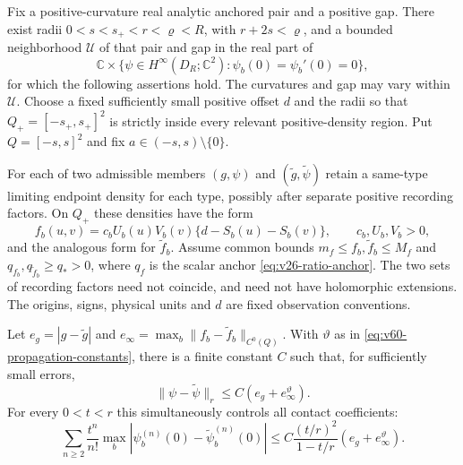 \begin{theorem}
\label{thm:v60-real-observation-stability}
Fix a positive-curvature real analytic anchored pair and a positive gap.
There exist radii $0<s<s_+<r<\varrho<R$, with
$r+2s<\varrho$, and a bounded neighborhood $\mathcal U$ of that pair
and gap in the real part of
\[
 \mathbb C\times\{\psi\in H^\infty(D_R;\mathbb C^2):
                              \psi_b(0)=\psi_b'(0)=0\},
\]
for which the following assertions hold.  The curvatures and gap may
vary within $\mathcal U$.  Choose a fixed sufficiently small positive
offset $d$ and the radii so that
$Q_+=[-s_+,s_+]^2$ is strictly inside every relevant positive-density
region.  Put $Q=[-s,s]^2$ and fix $a\in(-s,s)\setminus\{0\}$.

For each of two admissible members $(g,\psi)$ and
$(\widetilde g,\widetilde\psi)$ retain a same-type limiting endpoint
density for each type, possibly after separate positive recording
factors.  On $Q_+$ these densities have the form
\begin{equation}\label{eq:v60-recorded-density}
 f_b(u,v)=c_b U_b(u)V_b(v)
           \{d-S_b(u)-S_b(v)\},\qquad c_b,U_b,V_b>0,
\end{equation}
and the analogous form for $\widetilde f_b$.
Assume common bounds $m_f\le f_b,\widetilde f_b\le M_f$ and
$q_{f_b},q_{\widetilde f_b}\ge q_*>0$, where $q_f$ is the scalar
anchor \eqref{eq:v26-ratio-anchor}.  The two sets of recording factors
need not coincide, and need not have holomorphic extensions.
The origins, signs, physical units and $d$ are fixed observation
conventions.

Let $e_g=|g-\widetilde g|$ and
$e_\infty=\max_b\|f_b-\widetilde f_b\|_{C^0(Q)}$.
With $\vartheta$ as in \eqref{eq:v60-propagation-constants}, there is
a finite constant $C$ such that, for sufficiently small errors,
\begin{equation}\label{eq:v60-real-density-bound}
       \|\psi-\widetilde\psi\|_r
                    \le C(e_g+e_\infty^\vartheta).
\end{equation}
For every $0<t<r$ this simultaneously controls all contact coefficients:
\begin{equation}\label{eq:v60-all-real-coefficients}
 \sum_{n\ge2}\frac{t^n}{n!}
       \max_b|\psi_b^{(n)}(0)-\widetilde\psi_b^{(n)}(0)|
 \le C\frac{(t/r)^2}{1-t/r}
                         (e_g+e_\infty^\vartheta).
\end{equation}


\end{theorem}
